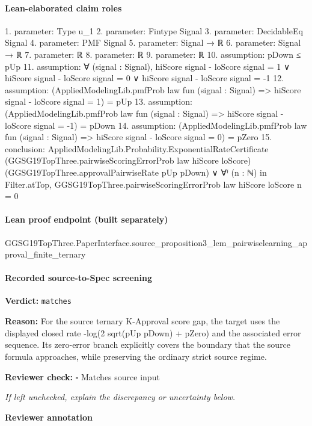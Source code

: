 \documentclass[10pt]{article}
\newcommand{\reviewerbox}{%
  \par\noindent\fbox{\parbox{0.96\linewidth}{\rule{0pt}{0.38in}}}\par
}
\newcommand{\reviewmatch}[1]{%
  \par\noindent\textbf{Reviewer check:} $\square$\; #1\par
  \noindent\emph{If left unchecked, explain the discrepancy or uncertainty below.}\par
}
\begin{document}
\paragraph{Lean-elaborated claim roles}\begin{ReviewVerbatim}
1. parameter: Type u_1
2. parameter: Fintype Signal
3. parameter: DecidableEq Signal
4. parameter: PMF Signal
5. parameter: Signal → ℝ
6. parameter: Signal → ℝ
7. parameter: ℝ
8. parameter: ℝ
9. parameter: ℝ
10. assumption: pDown ≤ pUp
11. assumption: ∀ (signal : Signal),
  hiScore signal - loScore signal = 1 ∨ hiScore signal - loScore signal = 0 ∨ hiScore signal - loScore signal = -1
12. assumption: (AppliedModelingLib.pmfProb law fun (signal : Signal) => hiScore signal - loScore signal = 1) = pUp
13. assumption: (AppliedModelingLib.pmfProb law fun (signal : Signal) => hiScore signal - loScore signal = -1) = pDown
14. assumption: (AppliedModelingLib.pmfProb law fun (signal : Signal) => hiScore signal - loScore signal = 0) = pZero
15. conclusion: AppliedModelingLib.Probability.ExponentialRateCertificate (GGSG19TopThree.pairwiseScoringErrorProb law hiScore loScore)
    (GGSG19TopThree.approvalPairwiseRate pUp pDown) ∨
  ∀ᶠ (n : ℕ) in Filter.atTop, GGSG19TopThree.pairwiseScoringErrorProb law hiScore loScore n = 0
\end{ReviewVerbatim}

\paragraph{Lean proof endpoint (built separately)}\begin{ReviewVerbatim}
GGSG19TopThree.PaperInterface.source_proposition3_lem_pairwiselearning_approval_finite_ternary
\end{ReviewVerbatim}

\paragraph{Recorded source-to-Spec screening}
\textbf{Verdict:} \texttt{matches}
\\
{\raggedright
\textbf{Reason:} For the source ternary K-\allowbreak{}Approval score gap, the target uses the displayed closed rate -\allowbreak{}log(2 sqrt(pUp pDown) + pZero) and the associated error sequence.\allowbreak{} Its zero-\allowbreak{}error branch explicitly covers the boundary that the source formula approaches, while preserving the ordinary strict source regime.\allowbreak{}
\par}
\reviewmatch{Matches source input}
\noindent\textbf{Reviewer annotation}\par
\reviewerbox
\clearpage
\hypertarget{source-claim-2576e5b507810949}{}
\end{document}
